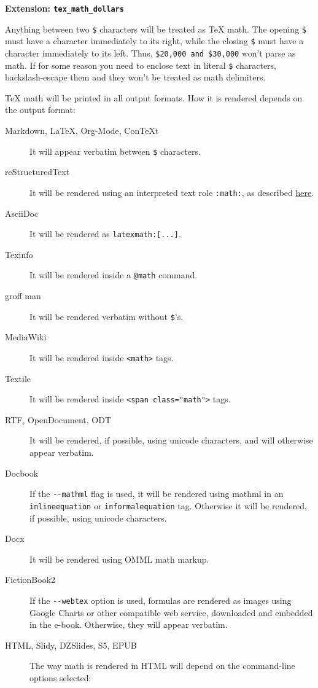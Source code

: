 \documentclass[]{article}
\begin{document}
\textbf{Extension: \texttt{tex\_math\_dollars}}

Anything between two \texttt{\$} characters will be treated as TeX math.
The opening \texttt{\$} must have a character immediately to its right,
while the closing \texttt{\$} must have a character immediately to its
left. Thus, \texttt{\$20,000 and \$30,000} won't parse as math. If for
some reason you need to enclose text in literal \texttt{\$} characters,
backslash-escape them and they won't be treated as math delimiters.

TeX math will be printed in all output formats. How it is rendered
depends on the output format:

\begin{description}
\item[Markdown, LaTeX, Org-Mode, ConTeXt]
It will appear verbatim between \texttt{\$} characters.
\item[reStructuredText]
It will be rendered using an interpreted text role \texttt{:math:}, as
described
\href{http://www.american.edu/econ/itex2mml/mathhack.rst}{here}.
\item[AsciiDoc]
It will be rendered as \texttt{latexmath:{[}...{]}}.
\item[Texinfo]
It will be rendered inside a \texttt{@math} command.
\item[groff man]
It will be rendered verbatim without \texttt{\$}'s.
\item[MediaWiki]
It will be rendered inside \texttt{\textless{}math\textgreater{}} tags.
\item[Textile]
It will be rendered inside
\texttt{\textless{}span class="math"\textgreater{}} tags.
\item[RTF, OpenDocument, ODT]
It will be rendered, if possible, using unicode characters, and will
otherwise appear verbatim.
\item[Docbook]
If the \texttt{-{}-mathml} flag is used, it will be rendered using
mathml in an \texttt{inlineequation} or \texttt{informalequation} tag.
Otherwise it will be rendered, if possible, using unicode characters.
\item[Docx]
It will be rendered using OMML math markup.
\item[FictionBook2]
If the \texttt{-{}-webtex} option is used, formulas are rendered as
images using Google Charts or other compatible web service, downloaded
and embedded in the e-book. Otherwise, they will appear verbatim.
\item[HTML, Slidy, DZSlides, S5, EPUB]
The way math is rendered in HTML will depend on the command-line options
selected:


\end{description}
\end{document}
